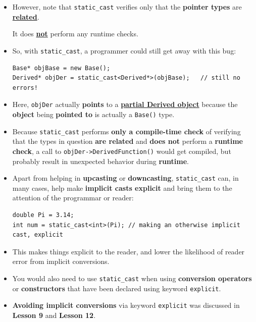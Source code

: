 \documentclass[10pt]{article}
\newcommand{\pbreak}{\vspace{30pt}}
\begin{document}
\begin{itemize}
	\item However, note that \verb|static_cast| verifies only that the \textbf{pointer types} are \textbf{\underline{related}}.

	It does \textbf{\underline{not}} perform any runtime checks.

\item So, with \verb|static_cast|, a programmer could still get away with this bug:

\begin{verbatim}
Base* objBase = new Base();
Derived* objDer = static_cast<Derived*>(objBase);	// still no errors!
\end{verbatim}

\item Here, \verb|objDer| actually \textbf{points} to a \textbf{\underline{partial Derived object}} because the \textbf{object} being \textbf{pointed to} is actually a \verb|Base()| type.

\item Because \verb|static_cast| performs \textbf{only a compile-time check} of verifying that the types in question \textbf{are related} and \textbf{does not} perform a \textbf{runtime check}, a call to \verb|objDer->DerivedFunction()| would get compiled, but probably result in unexpected behavior during \textbf{runtime}.
\end{itemize}

\newpage

\begin{itemize}
	\item Apart from helping in \textbf{upcasting} or \textbf{downcasting}, \verb|static_cast| can, in many cases, help make \textbf{implicit casts explicit} and bring them to the attention of the programmar or reader:

	\begin{verbatim}
double Pi = 3.14;
int num = static_cast<int>(Pi);	// making an otherwise implicit cast, explicit
	\end{verbatim}

\item This makes things explicit to the reader, and lower the likelihood of reader error from implicit conversions.

	\pbreak

\item You would also need to use \verb|static_cast| when using \textbf{conversion operators} or \textbf{constructors} that have been declared using keyword \verb|explicit|.

\item \textbf{Avoiding implicit conversions} via keyword \verb|explicit| was discussed in \textbf{Lesson 9} and \textbf{Lesson 12}.
\end{itemize}
\end{document}
